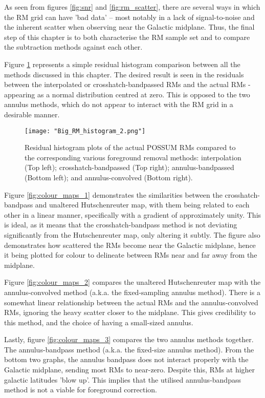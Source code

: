 As seen from figures \ref{fig:snr} and \ref{fig:rm_scatter}, there are several ways in which the RM grid can have 'bad data' – most notably in a lack of signal-to-noise and the inherent scatter when observing near the Galactic midplane. Thus, the final step of this chapter is to both characterise the RM sample set and to compare the subtraction methods against each other.


Figure \ref{fig:big_hist} represents a simple residual histogram comparison between all the methods discussed in this chapter. The desired result is seen in the residuals between the interpolated or crosshatch-bandpassed RMs and the actual RMs - appearing as a normal distribution centred at zero.  This is opposed to the two annulus methods, which do not appear to interact with the RM grid in a desirable manner.

\begin{figure}
    \texttt{[image: "Big\_RM\_histogram\_2.png"]}
    \centering
    \caption{Residual histogram plots of the actual POSSUM RMs compared to the corresponding various foreground removal methods: interpolation (Top left); crosshatch-bandpassed (Top right); annulus-bandpassed (Bottom left); and annulus-convolved (Bottom right).}
    \label{fig:big_hist}
\end{figure}


Figure \ref{fig:colour_maps_1} demonstrates the similarities between the crosshatch-bandpass and unaltered Hutschenreuter map, with them being related to each other in a linear manner, specifically with a gradient of approximately unity. This is ideal, as it means that the crosshatch-bandpass method is not deviating significantly from the Hutschenreuter map, only altering it subtly. The figure also demonstrates how scattered the RMs become near the Galactic midplane, hence it being plotted for colour to delineate between RMs near and far away from the midplane.


Figure \ref{fig:colour_maps_2} compares the unaltered Hutschenreuter map with the annulus-convolved method (a.k.a. the fixed-sampling annulus method). There is a somewhat linear relationship between the actual RMs and the annulus-convolved RMs, ignoring the heavy scatter closer to the midplane. This gives credibility to this method, and the choice of having a small-sized annulus.


Lastly, figure \ref{fig:colour_maps_3} compares the two annulus methods together. The annulus-bandpass method (a.k.a. the fixed-size annulus method). From the bottom two graphs, the annulus bandpass does not interact properly with the Galactic midplane, sending most RMs to near-zero. Despite this, RMs at higher galactic latitudes 'blow up'. This implies that the utilised annulus-bandpass method is not a viable for foreground correction.

